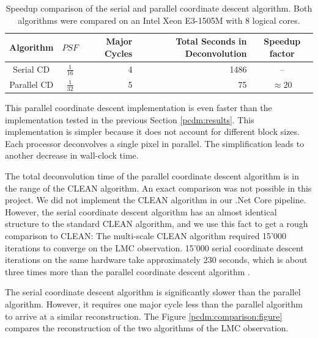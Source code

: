 \begin{table} [h]
	\centering
	\begin{tabular}{c | c | r | r | c}
		Algorithm &  $PSF$  & Major Cycles & Total Seconds in Deconvolution & Speedup factor\\ \hline
		Serial CD & $\frac{1}{16}$ & 4 & 1486 & --\\
		Parallel CD & $\frac{1}{32}$ & 5 & 75 & $\approx 20$ \\
	\end{tabular}
	\caption{Speedup comparison of the serial and parallel coordinate descent algorithm. Both algorithms were compared on an Intel Xeon E3-1505M with 8 logical cores.}
	\label{pcdm:comp:table}
\end{table}

This parallel coordinate descent implementation is even faster than the implementation tested in the previous Section \ref{pcdm:results}. This implementation is simpler because it does not account for different block sizes. Each processor deconvolves a single pixel in parallel. The simplification leads to another decrease in wall-clock time.

The total deconvolution time of the parallel coordinate descent algorithm is in the range of the CLEAN algorithm. An exact comparison was not possible in this project. We did not implement the CLEAN algorithm in our .Net Core pipeline. However, the serial coordinate descent algorithm has an almost identical structure to the standard CLEAN algorithm, and we use this fact to get a rough comparison to CLEAN: The multi-scale CLEAN algorithm required 15'000 iterations to converge on the LMC observation. 15'000 serial coordinate descent iterations on the same hardware take approximately 230 seconds, which is about three times more than the parallel coordinate descent algorithm .

The serial coordinate descent algorithm is significantly slower than the parallel algorithm. However, it requires one major cycle less than the parallel algorithm to arrive at a similar reconstruction. The Figure \ref{pcdm:comparison:figure} compares the reconstruction of the two algorithms of the LMC observation.

